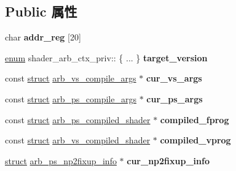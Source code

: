\subsection*{Public 属性}
\begin{DoxyCompactItemize}
\item 
\mbox{\label{structshader__arb__ctx__priv_a94d71004ed4876d5ecca6e1da17d13e8}} 
char {\bfseries addr\+\_\+reg} \mbox{[}20\mbox{]}
\item 
\mbox{\label{structshader__arb__ctx__priv_aa22698fb765054c112826e4e3c2895ea}} 
\hyperlink{interfaceenum}{enum} shader\+\_\+arb\+\_\+ctx\+\_\+priv\+:: \{ ... \}  {\bfseries target\+\_\+version}
\item 
\mbox{\label{structshader__arb__ctx__priv_ac0e45cbdbb2f0e118aac4c7abc3b4f49}} 
const \hyperlink{interfacestruct}{struct} \hyperlink{structarb__vs__compile__args}{arb\+\_\+vs\+\_\+compile\+\_\+args} $\ast$ {\bfseries cur\+\_\+vs\+\_\+args}
\item 
\mbox{\label{structshader__arb__ctx__priv_ab7ed4589e7286bc1c633814069fcfe07}} 
const \hyperlink{interfacestruct}{struct} \hyperlink{structarb__ps__compile__args}{arb\+\_\+ps\+\_\+compile\+\_\+args} $\ast$ {\bfseries cur\+\_\+ps\+\_\+args}
\item 
\mbox{\label{structshader__arb__ctx__priv_aabcce8597397a0a0dcb735aeaf7daae9}} 
const \hyperlink{interfacestruct}{struct} \hyperlink{structarb__ps__compiled__shader}{arb\+\_\+ps\+\_\+compiled\+\_\+shader} $\ast$ {\bfseries compiled\+\_\+fprog}
\item 
\mbox{\label{structshader__arb__ctx__priv_aa87d3df5638550704f227ea42673b9cc}} 
const \hyperlink{interfacestruct}{struct} \hyperlink{structarb__vs__compiled__shader}{arb\+\_\+vs\+\_\+compiled\+\_\+shader} $\ast$ {\bfseries compiled\+\_\+vprog}
\item 
\mbox{\label{structshader__arb__ctx__priv_ace66f489ae3a8b38e2b03b8c5c8f38a4}} 
\hyperlink{interfacestruct}{struct} \hyperlink{structarb__ps__np2fixup__info}{arb\+\_\+ps\+\_\+np2fixup\+\_\+info} $\ast$ {\bfseries cur\+\_\+np2fixup\+\_\+info}

\end{DoxyCompactItemize}

